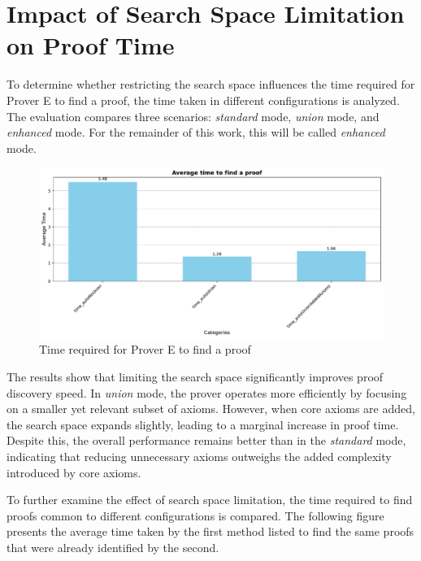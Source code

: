 \documentclass[english,version-2020-11]{uzl-thesis}
\begin{document}
\section{Impact of Search Space Limitation on Proof Time}

To determine whether restricting the search space influences the time required for Prover E to find a proof, the time taken in different configurations is analyzed. The evaluation compares three scenarios: \textit{standard} mode, \textit{union} mode, and \textit{enhanced} mode. For the remainder of this work, this will be called \textit{enhanced} mode.

\begin{figure}[h!]
    \centering
    \includegraphics[width=\textwidth]{time_to_find_proof.pdf}
    \caption{Time required for Prover E to find a proof}
    \label{fig:time_different_mode_1}
\end{figure}        
\FloatBarrier

The results show that limiting the search space significantly improves proof discovery speed. In \textit{union} mode, the prover operates more efficiently by focusing on a smaller yet relevant subset of axioms. However, when core axioms are added, the search space expands slightly, leading to a marginal increase in proof time. Despite this, the overall performance remains better than in the \textit{standard} mode, indicating that reducing unnecessary axioms outweighs the added complexity introduced by core axioms.

To further examine the effect of search space limitation, the time required to find proofs common to different configurations is compared. The following figure presents the average time taken by the first method listed to find the same proofs that were already identified by the second.
\end{document}

